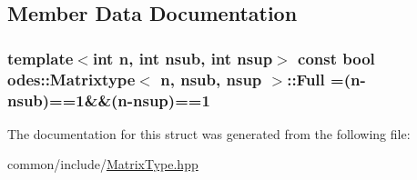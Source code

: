 \subsection{Member Data Documentation}
\hypertarget{structodes_1_1Matrixtype_a37c01995f06fa3c28fe86cc6a3ce62a3}{
\subsubsection[{Full}]{\setlength{\rightskip}{0pt plus 5cm}template$<$int n, int nsub, int nsup$>$ const bool {\bf odes\-::\-Matrixtype}$<$ n, nsub, nsup $>$\-::Full =(n-\/nsub)==1\&\&(n-\/nsup)==1\hspace{0.3cm}{\ttfamily [static]}}}\label{structodes_1_1Matrixtype_a37c01995f06fa3c28fe86cc6a3ce62a3}


The documentation for this struct was generated from the following file\-:\begin{DoxyCompactItemize}
\item 
common/include/\hyperlink{MatrixType_8hpp}{Matrix\-Type.\-hpp}\end{DoxyCompactItemize}
